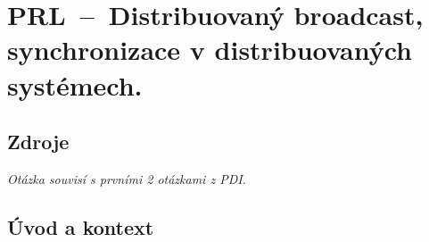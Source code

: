 

\graphicspath{{prl/distribuovany_broadcast/figures}}


\chapter{PRL~--~Distribuovaný broadcast, synchronizace v distribuovaných systémech.}


\section{Zdroje}

\begin{compactitem}
    \item {}
    \item \textit{Otázka souvisí s prvními 2 otázkami z PDI.}
\end{compactitem}


\section{Úvod a kontext}

